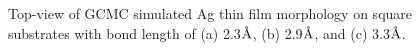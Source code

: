 \newpage
\begingroup
\begin{figure}[!ht]
  \centering
  \label{Chap:Ag/ZnO:fig:10a}
  \label{Chap:Ag/ZnO:fig:10b}
  \label{Chap:Ag/ZnO:fig:10c}
\caption[GCMC simulation results of Ag thin film morphology on square substrates.]{Top-view of \ac{GCMC} simulated Ag thin film morphology on square substrates with bond length of (a) 2.3$\mbox{\normalfont\AA}$, (b) 2.9$\mbox{\normalfont\AA}$, and (c) 3.3$\mbox{\normalfont\AA}$.}
  \label{Chap:Ag/ZnO:fig10-1}
\end{figure}
\endgroup

